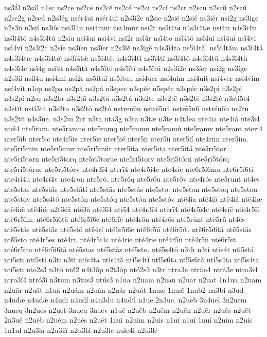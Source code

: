 {ns3ắl
n2sál
n1sc
ns2ce
ns2cē
ns2cĕ
ns2cé
ns2ci
ns2cĭ
ns2cr
n2scu
n2scŭ
n2scú
n2se2g
n2seú
n2s3ég
nsér4ui
nsér4uī
n2s3i2c
n2sie
n2siē
n2sié
ns3iér
nsi2g
ns3ige
n2s3ii
n2sií
ns3iís
nsi3l4u
nsi4mur
nsi4múr
nsi2r
ns5i4ta͞
n4s3i4tǣ
nsi4ti
n4s3i4tī
ns3i4tō
n4s3i4tū
n2siu
nsi4ui
nsi4vi
nsī2r
nsī́4r
nsī́4to
nsī́4tŏ
nsī́4ui
nsī́4uĭ
nsī́4vi
nsī́4vĭ
n2s3ĭ2c
n2sĭē
ns3ĭēn
ns3ĭēr
n2s3ĭĕ
ns3ĭgĕ
n4s3ĭ4ta
ns5ĭ4tă.
ns5ĭ4tăm
ns3ĭ4tá
n4s3ĭ4tæ
n4s3ĭ4tǣ
ns3ĭ4tǽ
ns5ĭ4tĕ.
n4s3ĭ4tī
ns3ĭ4tĭ
ns3ĭ4tō
n4s3ĭ4tū
n4s3ĭ4tŭ
n4s3ĭ́4c
nsĭ́4g
nsĭ́4t
n4s5ĭ́tă
n4s5ĭ́tĕ
n4s5ĭ́tĭ
n4s5ĭ́tŭ
n2s3í2c
ns3íer
nsí2g
ns3íge
n2s3íi
nsíl4u
nsí4mi
nsí2r
ns5ítuī
ns5ítuu
nsí4uer
nsí4uim
nsí4uit
nsí4ver
nsí4vim
nsí4vit
n1sp
ns2pa
ns2pă
ns2pá
n3spec
n3spĕc
n5spĕ́c
n3spéc
n3s2pi
n3s2pĭ
n3s2pí
n2sq
n3s2ta
n3s2tā
n3s2tă
n3s2tá
n3s2te
n3s2tē
n3s2tĕ
n3s2té
n3sti5t4
n3stĭt
nstí3t4
n3s2to
n3s2tō
ns2tó
nstren6u
nstrē5n4
nstrḗ5n6
nstrén6u
ns2tu
n3s2tŭ
n4s3ue.
n3s2uī
2nt
n3ta
nta3g
n3tā
n3tæ
n3te
n4t3eā
nte4ia
nte4iá
nte3ī4
nteī́4
nte5ram.
nte5ramne
nte5ramq
nte5ramu
nte5ramú
nte5ramv
nte5rant
nteri4
nter5ib
nter5ic
nte4r5ie
nter5iē
nter5ié
nter5ii
nter5iī
nter5ií
nte4rim
nter5im.
nte5ri5min
nte5ri5mur
nte5ri5múr
nter5ita
nter5itā
nter5itá
nte5ri5tor.
nte5ri5torn
nte5ri5torq
nte5ri5torue
nte5ri5torv
nte5ri5tórn
nte5ri5tórq
nte5ri5tórue
nte5ri5tórv
nte4r3ī4
nterī́4
nte4r5í4c
nte4ríe
nte6r5í6mu
nte6r5í6ti
nte4rí4u
nte4rí4v
nte4ron
nte5rō.
nte5rṓq
nte5rṓu
nte5rṓv
nte4rós
nte5runt
nt4es
nte5stas
nte5stās
nte5stātí
nte5stā́s
nte5stás
nte5sto.
nte5ston
nte5stoq
nte5stou
nte5stov
nte5s4tō
nte5stón
nte5stóq
nte5stóu
nte5stóv
ntē4ia
ntē4iā
ntē4iá
ntē4iæ
ntē4iǣ
ntē4iǽ
n2t3ĕā
ntĕ3ă
ntĕ3ī4
ntĕī́4
ntĕ4r3ī4
ntĕrī́4
ntĕ4r5ĭ4c
ntĕ4rĭē
ntĕ4r5ĭī
ntĕ6r5ĭm.
ntĕ6r5ĭ6tā
ntĕ6r5ĭ́6c
ntĕ6rĭ́ĕ
ntĕ4rōn
ntĕ4rōs
ntĕ5rŭnt
ntĕ5rŭ́
nt4ĕs
ntĕ5stās
ntĕ5stā́s
ntĕ5stō
ntĕ́4rī
ntĕ́6r5ĭ6c
ntĕ́6r5ĭī
ntĕ́6r5ĭt.
ntĕ́6r5ĭ6tā
ntĕ́5stās
ntĕ́5stō
nté4r5es
nté4ri.
nté4r5i4c
nté4rie
nté4riē
nté4r5ii
nté4r5iī
nté6r5it.
nté6r5ita
nté6r5i6tā
nté5stas
nté5stās
nté5sto.
nté5s4tō
n3th
n3ti
ntis4t
nti5stá
nti5sti
nti5stí
n3tī
n3tĭ
ntĭs4tā
ntĭs4tă
ntĭ5s4tĭ
ntĭ́5s6tā
ntĭ́5s6tă
ntí5s4ta
ntí5s4tā
ntí5sti
nto2s3
n3tō
ntŏ́2
n4t3ŏ́p
n2t3óp
ntó2s3
n3tr
ntra3e
ntrān4
ntrá3e
ntro3i4
ntro3í4
ntró3i
n3tum
n3tus3
ntús3
n1ua
n2uam
n2uan
n2uar
n2uat
1n1uā
n2uām
n2uār
n2uāt
n1uă
n2uám
n2uán
n2uár
n2uát
1nuæ
1nuǣ
1nub2
nu3bi
n3ud
n4udæ
n4udǽ
n4udi
n4udí
n4u3du
n4udú
n1ue
2n3ue.
n2ueb
3n4uel
3n2uem
3nueq
3n2ues
n2uet
3nueu
3nuev
n1uē
n2uēb
n2uēm
n2uēn
n2uēr
n2uēs
n2uēt
2n3uĕ
n2uéb
n2uém
n2ués
n2uét
1nui
n2uim
n2uis
n1uī
n1uĭ
1nuí
n2uím
n2uís
1n1ul
n2u3la
n2u3lā
n2u3lá
n2u3le
nule4i
n2u3lé
}
